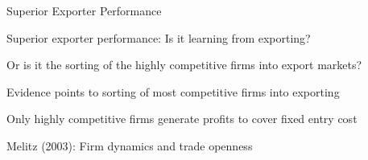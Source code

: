 \documentclass[notes,11pt, aspectratio=169, xcolor=table]{beamer}
\newenvironment{wideitemize}{\itemize\addtolength{\itemsep}{10pt}}{\enditemize}
\begin{document}
\begin{frame}{Superior Exporter Performance}

\begin{wideitemize}
    \item  Superior exporter performance: Is it learning from exporting?
    \item Or is it the sorting of the highly competitive firms into export markets?
    \item Evidence points to sorting of most competitive firms into exporting
    \item Only highly competitive firms generate profits to cover fixed entry cost
    \item Melitz (2003): Firm dynamics and trade openness
    
\end{wideitemize}

\end{frame}
\end{document}
